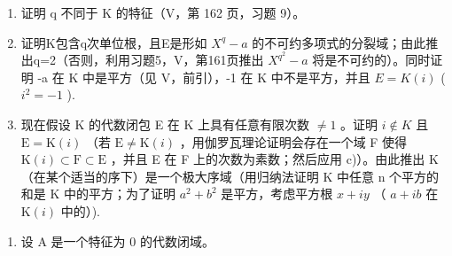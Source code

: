 \begin{enumerate}
\def\labelenumi{\alph{enumi})}
\setcounter{enumi}{1}
\item
  证明 q 不同于 K 的特征（V，第 162 页，习题 9）。
\item
  证明K包含q次单位根，且E是形如 \(X^{q}-a\) 的不可约多项式的分裂域；由此推出q=2（否则，利用习题5，V，第161页推出 \(X^{q^{2}}-a\) 将是不可约的）。同时证明 -a 在 K 中是平方（见 V，前引），-1 在 K 中不是平方，并且 \(E = K(i)\) ( \(i^{2} = -1\) ).
\item
  现在假设 K 的代数闭包 E 在 K 上具有任意有限次数 \(\neq1\) 。证明 \(i\notin K\) 且 \(\mathrm{E}=\mathrm{K}(i)\) （若 \(\mathrm{E}\neq\mathrm{K}(i)\) ，用伽罗瓦理论证明会存在一个域 F 使得 \(\mathrm{K}(i)\subset\mathrm{F}\subset\mathrm{E}\) ，并且 E 在 F 上的次数为素数；然后应用 c)）。由此推出 K（在某个适当的序下）是一个极大序域（用归纳法证明 K 中任意 n 个平方的和是 K 中的平方；为了证明 \(a^{2}+b^{2}\) 是平方，考虑平方根 \(x+iy\) （ \(a+ib\) 在 \(\mathrm{K}(i)\) 中的）).
\end{enumerate}

\begin{enumerate}
\def\labelenumi{\arabic{enumi})}
\setcounter{enumi}{31}
\tightlist
\item
  设 A 是一个特征为 0 的代数闭域。
\end{enumerate}

